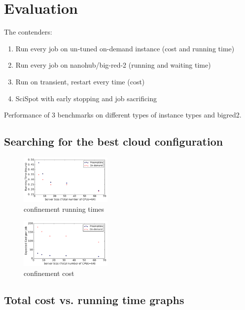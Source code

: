 \section{Evaluation}

The contenders:
\begin{enumerate}
\item Run every job on un-tuned on-demand instance (cost and running time)
\item Run every job on nanohub/big-red-2 (running and waiting time)
\item Run on transient, restart every time (cost)
\item SciSpot with early stopping and job sacrificing 
\end{enumerate}

Performance of 3 benchmarks on different types of instance types and bigred2.



\subsection{Searching for the best cloud configuration}

\begin{figure}[h]
  \centering
  \includegraphics[width=0.4\textwidth]{../graphs/confin_64_time.pdf}
  \caption{confinement running times}
  \label{fig:confin-64-times}
\end{figure}


\begin{figure}[h]
  \centering
  \includegraphics[width=0.4\textwidth]{../graphs/confin_64_cost.pdf}
  \caption{confinement cost}
  \label{fig:confin-64-cost}
\end{figure}



\subsection{Total cost vs. running time graphs}

